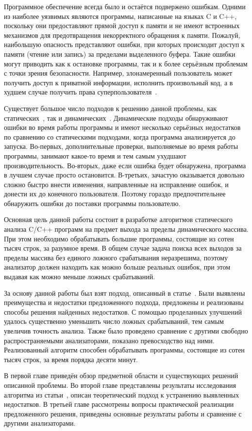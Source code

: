 
Программное обеспечение всегда было и остаётся подвержено
ошибкам. Одними из наиболее уязвимых являются программы, написанные на
языках C и C++, поскольку они предоставляют прямой доступ к памяти и
не имеют встроенных механизмов для предотвращения некорректного
обращения к памяти. Пожалуй, наибольшую опасность представляют ошибки,
при которых происходит доступ к памяти (чтение или запись) за
пределами выделенного буфера. Такие ошибки могут приводить как к
остановке программы, так и к более серьёзным проблемам с точки зрения
безопасности. Например, злонамеренный пользователь может получить
доступ к приватной информации, исполнить произвольный код, а в худшем
случае получить права суперпользователя~\cite{onesmashing}.

Существует большое число подходов к решению данной проблемы, как
статических~\cite{wagner2000first, xie2003archer, ganapathy2003buffer,
le2008marple, li2010practical}, так и
динамических~\cite{cowan1998stackguard,
ruwase2004practical}. Динамические подходы обнаруживают ошибки во
время работы программы и имеют несколько серьёзных недостатков по
сравнению со статическими подходами, когда программа анализируется до
запуска. Во-первых, дополнительные проверки, выполняемые во время
работы программы, занимают какое-то время и тем самым ухудшают
производительность. Во-вторых, даже если ошибка будет обнаружена,
программа в лучшем случае просто остановится. В-третьих, зачастую
оказывается довольно сложно быстро внести изменения, направленные на
исправление ошибок, и донести их до конечного пользователя. Поэтому
гораздо предпочтительнее обнаружить ошибки до поставки программы
пользователю.

Основная цель данной работы состоит в разработке алгоритмов
статического анализа C/C++ программ на предмет выхода за пределы
динамического массива. При этом необходимо обрабатывать большие
программы, состоящие из сотен тысяч строк, за разумное время. В общем
случае задача поиска всех выходов за пределы массива без единого
ложного срабатывания неразрешима, поэтому анализатор должен находить
как можно больше реальных ошибок, при этом выдавая как можно меньше
ложных срабатываний.

За основу данной работы был взят подход, описанный в
статье~\cite{li2010practical}. Были выявлены преимущества и недостатки
предложенного подхода, предложены и реализованы способы решения
найденных недостатков. С помощью проделанных улучшений удалось
существенно уменьшить число ложных срабатываний, тем самым увеличив
точность анализа. Также было проведено сравнение с другими свободно
распространяемыми анализаторами, показано превосходство над
ними. Реализованный алгоритм способен обрабатывать программы,
состоящие из сотен тысяч строк, за время порядка десяти минут.

В первой главе приведён обзор предметной области и существующих
решений описанной проблемы. Во второй главе представлены результаты
исследования алгоритма из статьи~\cite{li2010practical}, описан
теоретический подход к устранению выявленных недостатков. В третьей
главе рассмотрены вопросы практической реализации предложенного
решения, приведены основные результаты работы и сравнение с другими
анализаторами.
